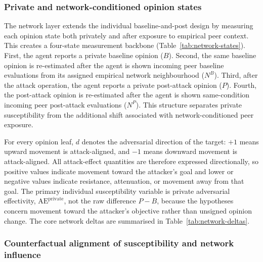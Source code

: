 \documentclass[11pt,a4paper]{article}
\begin{document}
\subsubsection{Private and network-conditioned opinion states}

The network layer extends the individual baseline-and-post design by measuring each opinion state
both privately and after exposure to empirical peer context. This creates a four-state measurement
backbone (Table~\ref{tab:network-states}). First, the agent reports a private baseline opinion
($B$). Second, the same baseline opinion is re-estimated after the agent is shown incoming peer
baseline evaluations from its assigned empirical network neighbourhood ($N^B$). Third, after the
attack operation, the agent reports a private post-attack opinion ($P$). Fourth, the post-attack
opinion is re-estimated after the agent is shown same-condition incoming peer post-attack
evaluations ($N^P$). This structure separates private susceptibility from the additional shift
associated with network-conditioned peer exposure.



For every opinion leaf, $d$ denotes the adversarial direction of the target: $+1$ means upward
movement is attack-aligned, and $-1$ means downward movement is attack-aligned. All attack-effect
quantities are therefore expressed directionally, so positive values indicate movement toward the
attacker's goal and lower or negative values indicate resistance, attenuation, or movement away from
that goal. The primary individual susceptibility variable is private adversarial effectivity,
\(\mathrm{AE}^{\mathrm{private}}\), not the raw difference \(P-B\), because the hypotheses concern
movement toward the attacker's objective rather than unsigned opinion change. The core network
deltas are summarised in Table~\ref{tab:network-deltas}.



\subsubsection{Counterfactual alignment of susceptibility and network influence}
\end{document}
